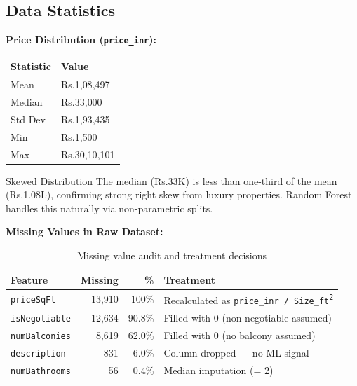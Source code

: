 \documentclass[12pt,a4paper]{article}
\makeatletter
\newcommand{\TH}[1]{\cellcolor{TblHead}\color{white}\sffamily\bfseries\small #1}
\newcommand{\RA}{\cellcolor{RowA}}
\newcommand{\RB}{\cellcolor{RowB}}
\newcommand{\Rs}{Rs.\@}          %
\makeatother
\begin{document}
\subsection{Data Statistics}

\noindent\textbf{Price Distribution (\texttt{price\_inr}):}

\vspace{4pt}
\begin{minipage}[t]{0.44\textwidth}
  \begin{tabular}{ll}
    \toprule
    \TH{Statistic} & \TH{Value} \\
    \midrule
    \RA Mean     & \Rs1{,}08{,}497 \\
    \RB Median   & \Rs33{,}000     \\
    \RA Std Dev  & \Rs1{,}93{,}435 \\
    \RB Min      & \Rs1{,}500      \\
    \RA Max      & \Rs30{,}10{,}101\\
    \bottomrule
  \end{tabular}
\end{minipage}\hfill
\begin{minipage}[t]{0.52\textwidth}
  \begin{notebox}{Skewed Distribution}
    \small The median (\Rs33K) is less than one-third of the mean (\Rs1.08L), confirming
    strong right skew from luxury properties. Random Forest handles this naturally via
    non-parametric splits.
  \end{notebox}
\end{minipage}

\vspace{8pt}
\noindent\textbf{Missing Values in Raw Dataset:}

\begin{table}[H]\centering
  \caption{Missing value audit and treatment decisions}
  \begin{tabular}{lrrl}
    \toprule
    \TH{Feature} & \TH{Missing} & \TH{\%} & \TH{Treatment} \\
    \midrule
    \RA\texttt{priceSqFt}    & 13{,}910 & 100\%  & Recalculated as \texttt{price\_inr / Size\_ft\textsuperscript{2}} \\
    \RB\texttt{isNegotiable} & 12{,}634 & 90.8\% & Filled with 0 (non-negotiable assumed) \\
    \RA\texttt{numBalconies} & 8{,}619  & 62.0\% & Filled with 0 (no balcony assumed) \\
    \RB\texttt{description}  & 831      & 6.0\%  & Column dropped --- no ML signal \\
    \RA\texttt{numBathrooms} & 56       & 0.4\%  & Median imputation (= 2) \\
    \bottomrule
  \end{tabular}
\end{table}
\end{document}
